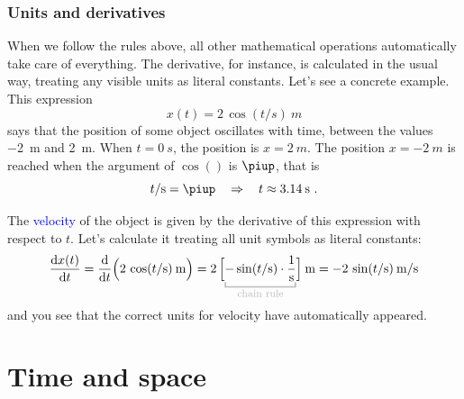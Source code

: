 \documentclass[a4paper,12pt,%
onecolumn,oneside,titlepage,%
british%
]{memoir}
\newcommand*{\pu}{\piup}%
\newcommand*{\di}{\mathrm{d}}%
\newcommand*{\limplies}{\mathbin{\Rightarrow}}%
\renewcommand*{\|}[1][]{\nonscript\:#1\vert\nonscript\:\mathopen{}}
\newcommand*{\sect}{\S}%
\newcommand*{\zerob}[1]{\makebox[0pt][c]{#1}}
\renewcommand*{\autoref}[2]{\sidepar{\vspace{-1ex}\footnotesize{\color{blue}\faIcon{%
angle-right%
}\enspace\sect\,\ref{#1} page\,\pageref{#1}}}\textcolor{blue}{#2}}
\begin{document}
\subsection{Units and derivatives}
\label{sec:units_derivatives}

When we follow the rules above, all other mathematical operations automatically take care of everything. The derivative, for instance, is calculated in the usual way, treating any visible units as literal constants. Let's see a concrete example. This expression
\begin{equation*}
x(t) = 2\,\cos(t/\unit{s})\:\unit{m}
\end{equation*}
says that the position of some object oscillates with time, between the values \qty{-2}{m} and \qty{+2}{m}. When $t=\qty{0}{s}$, the position is $x=\qty{+2}{m}$. The position $x=\qty{-2}{m}$ is reached when the argument of $\cos()$ is $\pu$, that is
\begin{equation*}
  t/\unit{s} = \pu \quad\limplies\quad t\approx \qty{3.14}{s} \ .
\end{equation*}

The \autoref{sec:velocity}{velocity} of the object is given by the derivative of this expression with respect to $t$. Let's calculate it treating all unit symbols as literal constants:
\begin{equation*}
  \frac{\di x(t)}{\di t} = \frac{\di}{\di t}\Bigl(
  2\,\cos(t/\unit{s})\:\unit{m}
  \Bigr)
  =
  2\,\Bigl[
  \mathcolor{grey}{\underbracket{\color{black}-\sin(t/\unit{s})\cdot\frac{1}{\unit{s}}}_{\zerob{\color{grey}\footnotesize chain rule}}}
  \Bigr]\:\unit{m}
  =
 -2\,\sin(t/\unit{s})\:\unit{m/s}
\end{equation*}
and you see that the correct units for velocity have automatically appeared.




\printpagenotes*
\clearpage
\chapter{Time and space}
\label{cha:time_space}
\end{document}
